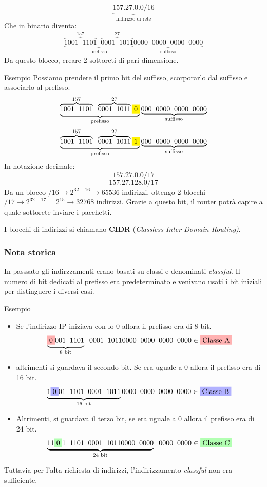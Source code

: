 \documentclass[a4paper]{article}
\begin{document}
\[\underbrace{157.27.0.0/16}_{\text{Indirizzo di rete}}\]
Che in binario diventa:
\[\underbrace{\overbrace{1001 \; \; 1101}^{157} \; \; \overbrace{0001 \; \; 1011}^{27}}_{\text{prefisso}} \underbrace{0000\; \; 0000 \; \;0000 \; \; 0000}_{\text{suffisso}} \]
Da questo blocco, creare 2 sottoreti di pari dimensione.
\begin{examplebox}{Esempio}
    Possiamo prendere il primo bit del suffisso, scorporarlo dal suffisso e associarlo al prefisso.
    \[\underbrace{\overbrace{1001 \; \; 1101}^{157} \; \; \overbrace{0001 \; \; 1011}^{27}\colorbox{yellow}{0}}_{\text{prefisso}}\underbrace{000\; \; 0000 \; \;0000 \; \; 0000}_{\text{suffisso}} \]
    \[\underbrace{\overbrace{1001 \; \; 1101}^{157} \; \; \overbrace{0001 \; \; 1011}^{27}\colorbox{yellow}{1}}_{\text{prefisso}}\underbrace{000\; \; 0000 \; \;0000 \; \; 0000}_{\text{suffisso}} \]
    In notazione decimale:
    \[157.27.0.0/17\]
    \[157.27.128.0/17\]
    Da un blocco $/16 \rightarrow 2^{32-16} \rightarrow 65536$ indirizzi, ottengo 2 blocchi $/17 \rightarrow 2^{32-17} = 2^{15} \rightarrow 32768$ indirizzi. Grazie a questo bit, il router potrà capire a quale sottorete inviare i pacchetti. 
\end{examplebox}

\begin{definition}
    I blocchi di indirizzi si chiamano \textbf{CIDR} (\textit{Classless Inter Domain Routing)}.
\end{definition}

\subsubsection{Nota storica}

In passsato gli indirzzamenti erano basati su classi e denominati \textit{classful}. Il numero di bit dedicati al prefisso
era predeterminato e venivano usati i bit iniziali per distinguere i diversi casi.

\begin{examplebox}{Esempio}
\begin{itemize}
    \item
    Se l'indirizzo IP iniziava con lo $0$ allora il prefisso era di 8 bit.
    \[\underbrace{\colorbox{red!30!white}{0}001 \; \; 1101}_{\text{8 bit}}\; \; 0001 \; \; 1011 0000\; \; 0000 \; \;0000 \; \; 0000 \in \text{\colorbox{red!30!white}{Classe A}}\]
    \item altrimenti si guardava il secondo bit. Se era uguale a 0 allora il prefisso era di 16 bit.
    \[\underbrace{1\colorbox{blue!30!white}{0}01 \; \; 1101\; \; 0001 \; \; 1011}_{\text{16 bit}} 0000\; \; 0000 \; \;0000 \; \; 0000 \in \text{\colorbox{blue!30!white}{Classe B}}\]
    \item Altrimenti, si guardava il terzo bit, se era uguale a 0 allora il prefisso era di 24 bit.
    \[\underbrace{11\colorbox{green!30!white}{0}1 \; \; 1101\; \; 0001 \; \; 1011 0000\; \; 0000}_{\text{24 bit}} \; \;0000 \; \; 0000 \in \text{\colorbox{green!30!white}{Classe C}}\]
\end{itemize}
\end{examplebox}
Tuttavia per l'alta richiesta di indirizzi, l'indirizzamento \textit{classful} non era sufficiente.
\end{document}
